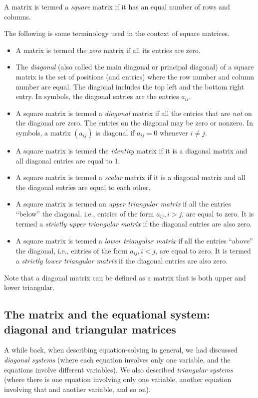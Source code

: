 \documentclass[10pt]{amsart}
\begin{document}
A matrix is termed a {\em square} matrix if it has an equal number of
rows and columns.

The following is some terminology used in the context of square matrices.

\begin{itemize}
\item A matrix is termed the {\em zero} matrix if all its entries are
  zero.
\item The {\em diagonal} (also called the main diagonal or principal
  diagonal) of a square matrix is the set of positions (and entries)
  where the row number and column number are equal. The diagonal
  includes the top left and the bottom right entry. In symbols, the
  diagonal entries are the entries $a_{ii}$.
\item A square matrix is termed a {\em diagonal} matrix if all the
  entries that are {\em not} on the diagonal are zero. The entries on
  the diagonal may be zero or nonzero. In symbols, a matrix $(a_{ij})$
  is diagonal if $a_{ij} = 0$ whenever $i \ne j$.
\item A square matrix is termed the {\em identity} matrix if it is a
  diagonal matrix and all diagonal entries are equal to $1$. 
\item A square matrix is termed a {\em scalar} matrix if it is a
  diagonal matrix and all the diagonal entries are equal to each other.
\item A square matrix is termed an {\em upper triangular matrix} if
  all the entries ``below'' the diagonal, i.e., entries of the form
  $a_{ij}, i > j$, are equal to zero. It is termed a {\em strictly
    upper triangular matrix} if the diagonal entries are also zero.
\item A square matrix is termed a {\em lower triangular matrix} if all
  the entries ``above'' the diagonal, i.e., entries of the form
  $a_{ij}, i < j$, are equal to zero. It is termed a {\em strictly
    lower triangular matrix} if the diagonal entries are also zero.
\end{itemize}

Note that a diagonal matrix can be defined as a matrix that is both
upper and lower triangular.

\subsection{The matrix and the equational system: diagonal and triangular matrices}

A while back, when describing equation-solving in general, we had
discussed {\em diagonal systems} (where each equation involves only
one variable, and the equations involve different variables). We also
described {\em triangular systems} (where there is one equation
involving only one variable, another equation involving that and
another variable, and so on).
\end{document}
